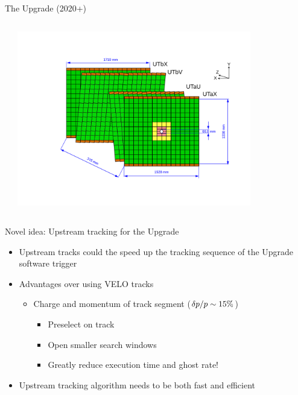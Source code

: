 \documentclass[aspectratio=1610]{beamer}
\begin{document}
\begin{frame}{The \lhcb Upgrade (2020+)}
\begin{columns}
\begin{column}{0.6\textwidth}
\end{column}
\begin{column}{0.4\textwidth}
\centering
\vspace{-1cm}
\includegraphics[width=0.8\textwidth]{figs/detector/UT.pdf}
\end{column}

\end{columns}

\end{frame}

\begin{frame}{Novel idea: Upstream tracking for the Upgrade}
\begin{itemize}
  \item Upstream tracks could the speed up the tracking sequence of the Upgrade software trigger
  \item Advantages over using VELO tracks
    \begin{itemize}
      \item Charge and momentum of track segment ($\delta \mbox{$p$}/\mbox{$p$} \sim 15 \%$)
      \begin{itemize}
        \item[\ding{212}] Preselect on track \pt
        \item[\ding{212}] Open smaller search windows
        \item[\ding{70}] Greatly reduce execution time and ghost rate!
      \end{itemize}
    \end{itemize}
  \end{itemize}

  \begin{center}
  
  \end{center}

  \begin{itemize}
  \item Upstream tracking algorithm needs to be both fast and efficient
  \end{itemize}
\end{frame}
\end{document}
